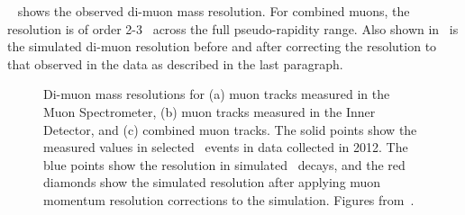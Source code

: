 ~ shows the observed di-muon mass resolution. For
combined muons, the resolution is of order 2-3 \gev\ across the full
pseudo-rapidity range. Also shown in~ is the simulated
di-muon resolution before and after correcting the resolution to that observed
in the data as described in the last paragraph.

\begin{figure}[h]
\centering
\caption{Di-muon mass resolutions for (a) muon tracks measured in the Muon
Spectrometer, (b) muon tracks measured in the Inner Detector, and (c) combined muon
tracks. The solid points show the measured values in selected \Zmm\ events in data collected in 2012. The
blue points show the resolution in simulated \Zmm\ decays, and the red diamonds
show the simulated resolution after applying muon momentum resolution corrections to the simulation. Figures from~\cite{MuonPerfPlots2012}.}
\label{fig:mu-resolution-dimu}
\end{figure}

